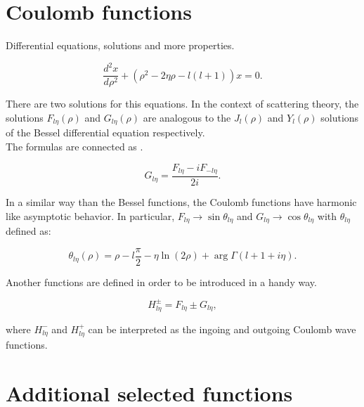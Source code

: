 \documentclass[openany]{book}
\begin{document}
\section{Coulomb functions} \label{sec:coulomb}

Differential equations, solutions and more properties.

\begin{equation}  \label{eq:special_coulomb_diffEquation}
	\frac{d^2x}{d\rho^2}+ (\rho^2 - 2\eta \rho  - l(l+1) )x= 0.
\end{equation}

There are two solutions for this equations. In the context of scattering theory, the solutions $F_{l\eta}(\rho)$ and $G_{l\eta}(\rho)$ are analogous to the  $J_l(\rho)$ and $Y_l(\rho)$ solutions of the Bessel differential equation respectively.  \\

The formulas are connected as \cite{gaspard_2018}.

\begin{equation}  \label{eq:special_coulomb_connection}
	G_{l\eta} = \frac{F_{l\eta} - iF_{-l\eta} }{2i}.
\end{equation}

In a similar way than the Bessel functions, the Coulomb functions have harmonic like asymptotic behavior. In particular,  $F_{l\eta} \rightarrow \sin{\theta_{l\eta}}$ and $G_{l\eta} \rightarrow \cos{\theta_{l\eta}}$ with $\theta_{l\eta}$ defined as:

\begin{equation} \label{eq:special_coulomb_theta}
	\theta_{l\eta}(\rho) = \rho -  l\frac{\pi}{2}  - \eta\ln{(2\rho)} +  \arg\Gamma(l+ 1+i\eta).
\end{equation}

Another functions are defined in order to be introduced in a handy way. 

\begin{equation}\label{eq:special_coulomb_hankel}
	H^{\pm}_{l\eta} = F_{l\eta} \pm G_{l\eta},
\end{equation}

where $H^{-}_{l\eta}$ and $H^{+}_{l\eta}$ can be interpreted as the ingoing and outgoing Coulomb wave functions. 

\section{Additional selected functions} \label{sec:additionalFunctions}
\end{document}
